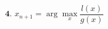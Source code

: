 \documentclass[preview]{standalone}
\begin{document}
\begin{align*}
\textbf{4. }x_{n+1} = \arg\max_x \dfrac{l(x)}{g(x)}
\end{align*}
\end{document}
